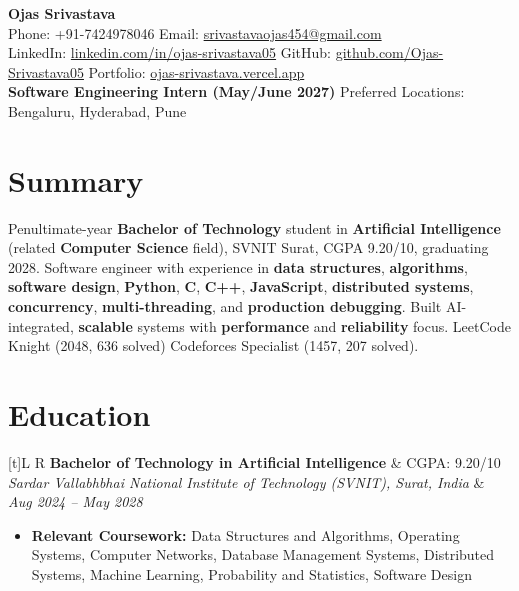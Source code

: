 \documentclass[a4paper,10pt]{article}
\newcommand{\resumeSubheading}[4]{
  \vspace{1mm}
  \noindent
  \begin{tabularx}{\textwidth}[t]{L R}
    \textbf{#1} & #4 \\
    \textit{#3} & \textit{#2} \\
  \end{tabularx}
  \vspace{-1mm}
}
\begin{document}
\selectfont

\begin{center}
  {\LARGE \textbf{Ojas Srivastava}} \\[1mm]
  \small
  Phone: +91-7424978046 \textbar{}
  Email: \href{mailto:srivastavaojas454@gmail.com}{srivastavaojas454@gmail.com} \\[0.5mm]
  LinkedIn: \href{https://linkedin.com/in/ojas-srivastava05}{linkedin.com/in/ojas-srivastava05} \textbar{}
  GitHub: \href{https://github.com/Ojas-Srivastava05}{github.com/Ojas-Srivastava05} \textbar{}
  Portfolio: \href{https://ojas-srivastava.vercel.app}{ojas-srivastava.vercel.app} \\[0.5mm]
  \textbf{Software Engineering Intern (May/June 2027)} \textbar{}
  Preferred Locations: Bengaluru, Hyderabad, Pune
\end{center}

\vspace{-1mm}

\section{Summary}
\small
Penultimate-year \textbf{Bachelor of Technology} student in \textbf{Artificial Intelligence} (related \textbf{Computer Science} field), SVNIT Surat, CGPA 9.20/10, graduating 2028. Software engineer with experience in \textbf{data structures}, \textbf{algorithms}, \textbf{software design}, \textbf{Python}, \textbf{C}, \textbf{C++}, \textbf{JavaScript}, \textbf{distributed systems}, \textbf{concurrency}, \textbf{multi-threading}, and \textbf{production debugging}. Built AI-integrated, \textbf{scalable} systems with \textbf{performance} and \textbf{reliability} focus. LeetCode Knight (2048, 636 solved) \textbar{} Codeforces Specialist (1457, 207 solved).

\section{Education}
\small
\resumeSubheading
  {Bachelor of Technology in Artificial Intelligence}{Aug 2024 -- May 2028}
  {Sardar Vallabhbhai National Institute of Technology (SVNIT), Surat, India}{CGPA: 9.20/10}
\begin{itemize}
  \item \textbf{Relevant Coursework:} Data Structures and Algorithms, Operating Systems, Computer Networks, Database Management Systems, Distributed Systems, Machine Learning, Probability and Statistics, Software Design
\end{itemize}
\end{document}
